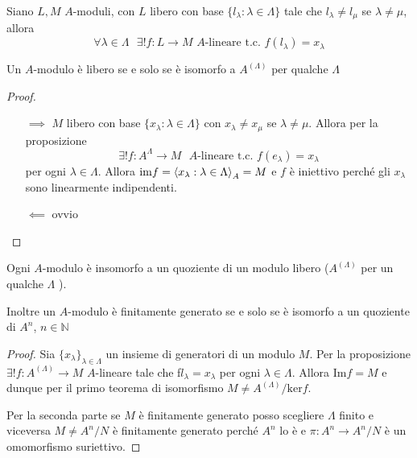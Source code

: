 \begin{proposition}{}
    Siano \(L, M\) \(A\)-moduli, con \(L\) libero con base \(\{l_\lambda : \lambda \in \Lambda\} \) tale che \(l_\lambda \neq l_\mu\) se \(\lambda \neq \mu\), allora
    \[
      \forall \lambda \in  \Lambda \,\,\,\, \exists ! f :
  L\to M \,\, A\text{-lineare t.c. }f{(l_\lambda)} = x_\lambda
    \]
\end{proposition}
\begin{corollary}{}
    Un \(A\)-modulo è libero se e solo se è isomorfo a \(A^{{(\Lambda)}}\) per
    qualche \(\Lambda\) 
\end{corollary}
\begin{proof}\( \)
\begin{itemize}
    \item[\(\implies \)] \(M\) libero con base \(\{x_\lambda : \lambda \in \Lambda\}\) con \(x_\lambda\neq x_\mu\) se \(\lambda \neq \mu\). Allora per la proposizione
        \[
          \exists ! f : A^{\Lambda} \to M \text{ \(A\)-lineare t.c. } f{(e_\lambda)} = x_\lambda 
        \]
        per ogni \(\lambda \in \Lambda\).
        Allora \(\mathrm{im}f = {\left\langle x_{\lambda} : \lambda \in \Lambda\right\rangle}_A = M\) e \(f\) è iniettivo perché gli \(x_\lambda\) sono linearmente indipendenti.
    \item[\(\impliedby \)] ovvio
\end{itemize}
\end{proof}

\begin{corollary}{}
    Ogni \(A\)-modulo è insomorfo a un quoziente di un modulo libero (\(A^{{(\Lambda)}}\) per un qualche \(\Lambda\) ).

    Inoltre un \(A\)-modulo è finitamente generato se e solo se è isomorfo a un quoziente di \(A^{n}\), \(n \in \mathbb{N}\) 
\end{corollary}
\begin{proof}{}
    Sia \(\{x_{\lambda} \}_{\lambda \in \Lambda}  \) un insieme di generatori di
    un modulo \(M\). Per la proposizione \(\exists ! f: A^{{(\Lambda)}}\to M\)
    \(A\)-lineare tale che f\(l_\lambda = x_\lambda\) per ogni \(\lambda \in
    \Lambda\). Allora \(\mathrm{Im}f = M\) e dunque per il primo teorema di
    isomorfismo \(M\neq A^{{(\Lambda)}} / \mathrm{ker}f\).

    Per la seconda parte se \(M\) è finitamente generato posso scegliere \(\Lambda\) finito e viceversa \(M\neq A^{n} / N\) è finitamente generato perché \(A^{n}\) lo è e \(\pi : A^{n}\to A^{n} / N\) è un omomorfismo suriettivo.

\end{proof}

